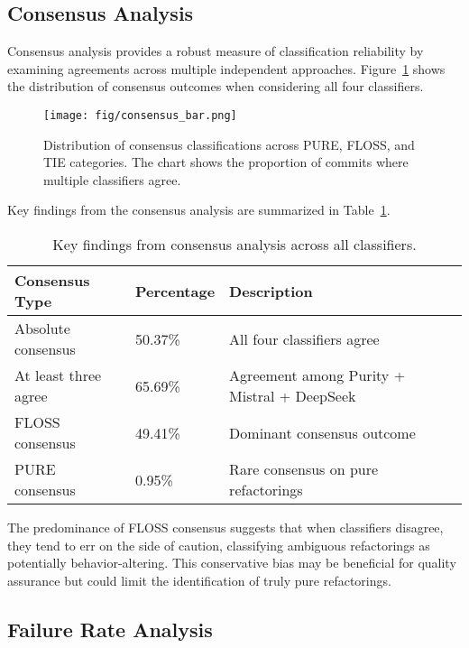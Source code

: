 \subsection{Consensus Analysis}

Consensus analysis provides a robust measure of classification reliability by examining agreements across multiple independent approaches. Figure~\ref{fig:consensus-distribution} shows the distribution of consensus outcomes when considering all four classifiers.

\begin{figure}[H]
\centering
\texttt{[image: fig/consensus\_bar.png]}
\caption{Distribution of consensus classifications across PURE, FLOSS, and TIE categories. The chart shows the proportion of commits where multiple classifiers agree.}
\label{fig:consensus-distribution}
\end{figure}

Key findings from the consensus analysis are summarized in Table~\ref{tab:consensus-findings}.

\begin{table}[ht]
\centering
\caption{Key findings from consensus analysis across all classifiers.}
\label{tab:consensus-findings}
\begin{tabular}{@{}p{}p{}p{}@{}}
\toprule
\textbf{Consensus Type} & \textbf{Percentage} & \textbf{Description} \\
\midrule
Absolute consensus & 50.37\% & All four classifiers agree \\
At least three agree & 65.69\% & Agreement among Purity + Mistral + DeepSeek \\
FLOSS consensus & 49.41\% & Dominant consensus outcome \\
PURE consensus & 0.95\% & Rare consensus on pure refactorings \\
\bottomrule
\end{tabular}
\end{table}

The predominance of FLOSS consensus suggests that when classifiers disagree, they tend to err on the side of caution, classifying ambiguous refactorings as potentially behavior-altering. This conservative bias may be beneficial for quality assurance but could limit the identification of truly pure refactorings.

\subsection{Failure Rate Analysis}

